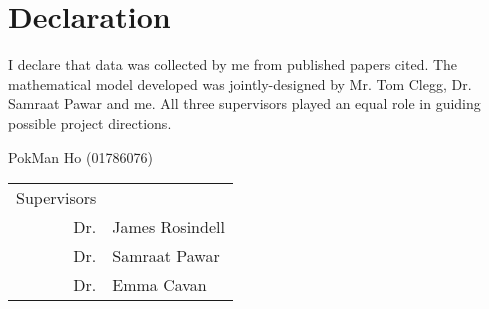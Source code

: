 \documentclass[../thesis.tex]{subfiles} %
\begin{document}
\maketitle\clearpage

\section*{Declaration}
I declare that data was collected by me from published papers cited.  The mathematical model developed was jointly-designed by Mr. Tom Clegg, Dr. Samraat Pawar and me.  All three supervisors played an equal role in guiding possible project directions.

\begin{flushright}
PokMan Ho (01786076)

\begin{tabular}{rl}
    Supervisors & \\
    Dr. & James Rosindell \\
    Dr. & Samraat Pawar \\
    Dr. & Emma Cavan
\end{tabular}
\end{flushright}

\tableofcontents
\listoffigures
\listoftables
\end{document}
